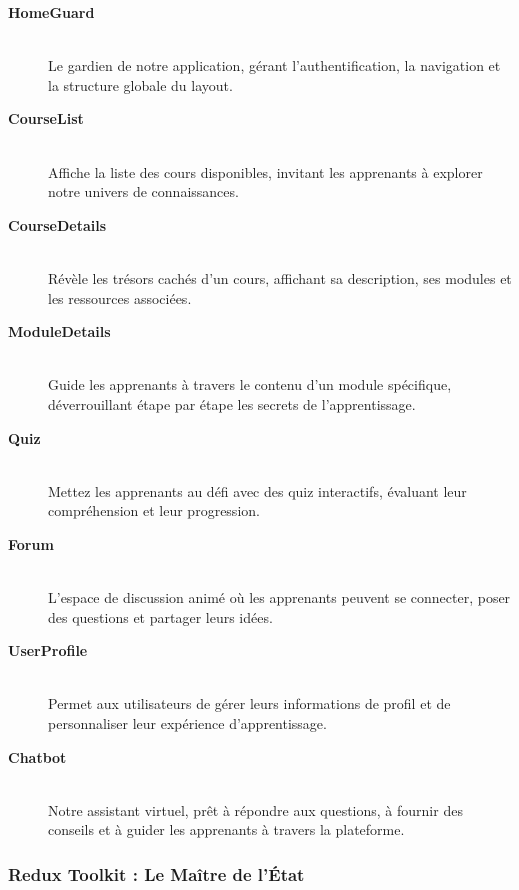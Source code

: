 \begin{description}
    \item[\textbf{HomeGuard}] \hfill \\
    Le gardien de notre application, gérant l'authentification, la navigation et la structure globale du layout.
    
    \item[\textbf{CourseList}] \hfill \\
    Affiche la liste des cours disponibles, invitant les apprenants à explorer notre univers de connaissances.
    
    \item[\textbf{CourseDetails}] \hfill \\
    Révèle les trésors cachés d'un cours, affichant sa description, ses modules et les ressources associées.
    
    \item[\textbf{ModuleDetails}] \hfill \\
    Guide les apprenants à travers le contenu d'un module spécifique, déverrouillant étape par étape les secrets de l'apprentissage.
    
    \item[\textbf{Quiz}] \hfill \\
    Mettez les apprenants au défi avec des quiz interactifs, évaluant leur compréhension et leur progression.
    
    \item[\textbf{Forum}] \hfill \\
    L'espace de discussion animé où les apprenants peuvent se connecter, poser des questions et partager leurs idées.
    
    \item[\textbf{UserProfile}] \hfill \\
    Permet aux utilisateurs de gérer leurs informations de profil et de personnaliser leur expérience d'apprentissage.

    \item[\textbf{Chatbot}] \hfill \\
    Notre assistant virtuel, prêt à répondre aux questions, à fournir des conseils et à guider les apprenants à travers la plateforme.

\end{description}

\subsubsection{Redux Toolkit :  Le Maître de l'État}

